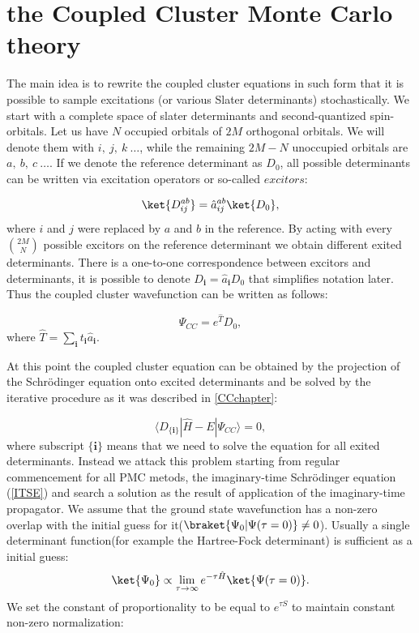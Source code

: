 \documentclass[twoside,english]{uiofysmaster}
\begin{document}
\section{the Coupled Cluster Monte Carlo theory}
The main idea is to rewrite the coupled cluster equations in such form
that it is possible to sample excitations (or various Slater determinants) stochastically. We start with a
complete space of slater determinants and second-quantized
spin-orbitals. Let us have $N$ occupied orbitals of $2M$ orthogonal
orbitals. We will denote them with $i,\ j,\ k \ \dots$, while the remaining
$2M-N$ unoccupied orbitals are $a, \ b, \ c \ \dots$.  If we denote
the reference determinant as $D_0$, all possible determinants can be
written via excitation operators or so-called $excitors$:

\begin{equation}
\ket{D_{ij}^{ab}} = \hat{a}_{ij}^{ab}\ket{ D_0},
\end{equation}
where $i$ and $j$ were replaced by $a$ and $b$ in the reference. By
acting with every $\binom {2M}{N}$ possible excitors on the reference
determinant we obtain different exited determinants. There is a
one-to-one correspondence between excitors and determinants, it is
possible to denote $D_{\boldsymbol{i}} = \hat{a}_{\boldsymbol{i}} D_0$
that simplifies notation later. Thus the coupled cluster wavefunction
can be written as follows:

\begin{equation}
\Psi_{CC}=e^{\hat{T}}D_0, 
\end{equation}
where $\hat{T} = \sum_{\boldsymbol{i}} t_{\boldsymbol{i}} \hat{a}_{\boldsymbol{i}}$.

At this point the coupled cluster equation can be obtained by the
projection of the Schr\"{o}dinger equation onto excited determinants
and be solved by the iterative procedure as it was described in
\autoref{CCchapter}:

\begin{equation}\label{CCbf}
\langle D_{\{\boldsymbol{i}\}}|\hat{H}-E|\Psi_{CC}\rangle = 0, 
\end{equation}
where subscript $\{\boldsymbol{i}\}$ means that we need to solve the
equation for all exited determinants. Instead we attack this problem
starting from regular commencement for all PMC metods, the
imaginary-time Schr\"{o}dinger equation (\ref{ITSE}) and search a
solution as the result of application of the imaginary-time
propagator. We assume that the ground state wavefunction has a
non-zero overlap with the initial guess for
it($\braket{\Psi_0|\Psi(\tau=0)} \neq 0$). Usually a single
determinant function(for example the Hartree-Fock determinant) is
sufficient as a initial guess:
\begin{equation}\label{SEsolutionpropagator11}
\ket{\Psi_0} \propto \lim_{\tau \rightarrow \infty} e^{-\tau \hat{H}}\ket{\Psi(\tau = 0)}.
\end{equation}
We set the constant of proportionality to be equal to $e^{\tau S}$ to maintain constant non-zero normalization:
\end{document}
